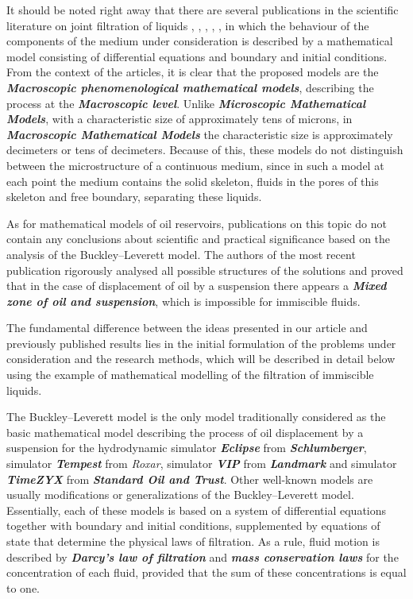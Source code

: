 \documentclass{article}
\theoremstyle{plain}
\theoremstyle{definition}
\numberwithin{equation}{section}
\begin{document}
It should be noted right away that there are several publications in the scientific literature on joint filtration of liquids \cite{1}, \cite{3}, \cite{4}, \cite{7}, \cite{13}, in which the behaviour of the components of the medium under consideration is described by a mathematical model consisting of differential equations and boundary and initial conditions. From the context of the articles, it is clear that the proposed models are the \textbf{\emph{Macroscopic phenomenological mathematical models}}, describing the process at the \textbf{\emph{Macroscopic level}}. Unlike \textbf{\emph{Microscopic Mathematical Models}}, with a characteristic size of approximately tens of microns, in \textbf{\emph{Macroscopic Mathematical Models}} the characteristic size is approximately decimeters or tens of decimeters. Because of this, these models do not distinguish between the microstructure of a continuous medium, since in such a model at each point the medium contains the solid skeleton, fluids in the pores of this skeleton and free  boundary, separating these liquids.

As for mathematical models of oil reservoirs, publications on this topic do not contain any conclusions about scientific and practical significance based on the analysis of the Buckley--Leverett model. The authors of the most recent publication \cite{13} rigorously analysed all possible structures of the solutions and proved that in the case of displacement of oil by a suspension there appears a \emph{\textbf{Mixed zone of oil and suspension}}, which is impossible for immiscible fluids.

The fundamental difference between the ideas presented in our article and previously published results lies in the initial formulation of the problems under consideration and the research methods, which will be described in detail below using the example of mathematical modelling of the filtration of immiscible liquids.

The Buckley--Leverett model is the only model traditionally considered as the basic mathematical model describing the process of oil displacement by a suspension for the hydrodynamic simulator \textbf{\emph{Eclipse}} from \textbf{\emph{Schlumberger}}, simulator \textbf{\emph{Tempest}} from \emph{\emph{Roxar}}, simulator \textbf{\emph{VIP}} from \textbf{\emph{Landmark}} and simulator \textbf{\emph{TimeZYX}} from \textbf{\emph{Standard Oil and Trust}}. Other well-known models are usually modifications or generalizations of the Buckley--Leverett model. Essentially, each of these models is based on a system of differential equations together with boundary and initial conditions, supplemented by equations of state that determine the physical laws of filtration. As a rule, fluid motion is described by \emph{\textbf{Darcy's law of filtration}} and \textbf{\emph{mass conservation laws}} for the concentration of each fluid, provided that the sum of these concentrations is equal to one. 
\end{document}

